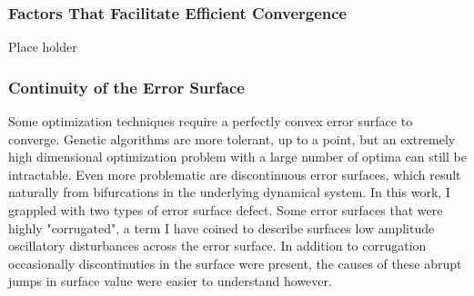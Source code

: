 

\subsubsection{Factors That Facilitate Efficient Convergence}
Place holder


\subsubsection{Continuity of the Error Surface}
Some optimization techniques require a perfectly convex error surface to converge.
Genetic algorithms are more tolerant, up to a point, but an extremely high dimensional optimization problem with a large number of optima can still be intractable.
Even more problematic are discontinuous error surfaces, which result naturally from bifurcations in the underlying dynamical system.
In this work, I grappled with two types of error surface defect. Some error surfaces that were highly "corrugated", a term I have coined to describe surfaces low amplitude oscillatory disturbances across the error surface. In addition to corrugation occasionally discontinuties in the surface were present, the causes of these abrupt jumps in surface value were easier to understand however.  


